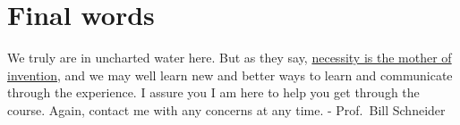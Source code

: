 \documentclass[11pt]{article}
\begin{document}
\section{Final words}
\label{sec:orgb333156}
We truly are in uncharted water here.  But as they say, \href{https://en.wikipedia.org/wiki/Necessity\_is\_the\_mother\_of\_invention}{necessity is the mother of invention}, and we may well learn new and better ways to learn and communicate through the experience. I assure you I am here to help you get through the course. Again, contact me with any concerns at any time. - Prof.~Bill Schneider
\end{document}
